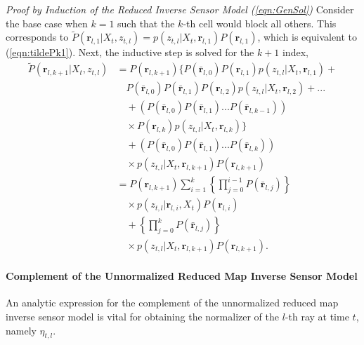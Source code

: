 \documentclass[letterpaper, 10pt, conference]{ieeeconf}
\newcommand{\refeqn}[1]{(\ref{eqn:#1})}
\begin{document}
\begin{appendix}
\emph{Proof by Induction of the Reduced Inverse Sensor Model \refeqn{GenSol}}
Consider the base case when $k=1$ such that the $k$-th cell would block all others. This corresponds to $\tilde P(\mathbf{r}_{l,1}|X_t,z_{t,l})=p(z_{t,l}|X_t,\mathbf{r}_{l,1})P(\mathbf{r}_{l,1})$, which is equivalent to \refeqn{tildePk1}.
Next, the inductive step is solved for the $k+1$ index,
\begin{align}
\label{eqn:GenSol_InductiveStep}
\tilde P(\mathbf{r}_{l,k+1}|X_t,z_{t,l})
&=P(\mathbf{r}_{l,k+1})\bigg\{
P(\bar{\mathbf{r}}_{l,0})P(\mathbf{r}_{l,1})p(z_{t,l}|X_t,\mathbf{r}_{l,1})+\nonumber\\&\quad P(\bar{\mathbf{r}}_{l,0})P(\bar{\mathbf{r}}_{l,1})P(\mathbf{r}_{l,2})p(z_{t,l}|X_t,\mathbf{r}_{l,2})+...\nonumber
\\
&\quad +\left(
P(\bar{\mathbf{r}}_{l,0})P(\bar{\mathbf{r}}_{l,1})...P(\bar{\mathbf{r}}_{l,k-1})
\right)\nonumber
\\
&\quad\times P(\mathbf{r}_{l,k})p(z_{t,l}|X_t,\mathbf{r}_{l,k})\bigg\}\nonumber
\\
&\quad
+\left(
P(\bar{\mathbf{r}}_{l,0})P(\bar{\mathbf{r}}_{l,1})...P(\bar{\mathbf{r}}_{l,k})
\right)\nonumber
\\
&\quad\times p(z_{t,l}|X_t,\mathbf{r}_{l,k+1})P(\mathbf{r}_{l,k+1})\nonumber
\\
&=P(\mathbf{r}_{l,k+1})\sum_{i=1}^{k}\left\{\prod_{j=0}^{i-1}P(\bar{\mathbf{r}}_{l,j})\right\}\nonumber
\\
&\quad\times p(z_{t,l}|\mathbf{r}_{l,i},X_t)P(\mathbf{r}_{l,i})\nonumber\\&\quad
+
\left\{\prod_{j=0}^{k}P(\bar{\mathbf{r}}_{l,j})\right\}\nonumber
\\
&\quad\times p(z_{t,l}|X_t,\mathbf{r}_{l,k+1})P(\mathbf{r}_{l,k+1})
.
\end{align}

\paragraph{Complement of the Unnormalized Reduced Map Inverse Sensor Model}
An analytic expression for the complement of the unnormalized reduced map inverse sensor model is vital for obtaining the normalizer of the $l$-th ray at time $t$, namely $\eta_{t,l}$.



\end{appendix}
\end{document}
